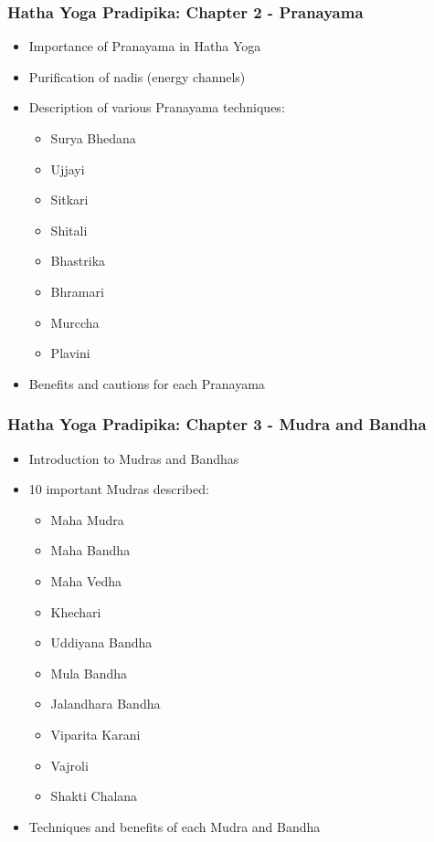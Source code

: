 \begin{frame}[fragile]\frametitle{Hatha Yoga Pradipika: Chapter 2 - Pranayama}
\begin{itemize}
    \item Importance of Pranayama in Hatha Yoga
    \item Purification of nadis (energy channels)
    \item Description of various Pranayama techniques:
    \begin{itemize}
        \item Surya Bhedana
        \item Ujjayi
        \item Sitkari
        \item Shitali
        \item Bhastrika
        \item Bhramari
        \item Murccha
        \item Plavini
    \end{itemize}
    \item Benefits and cautions for each Pranayama
\end{itemize}
\end{frame}

\begin{frame}[fragile]\frametitle{Hatha Yoga Pradipika: Chapter 3 - Mudra and Bandha}
\begin{itemize}
    \item Introduction to Mudras and Bandhas
    \item 10 important Mudras described:
    \begin{itemize}
        \item Maha Mudra
        \item Maha Bandha
        \item Maha Vedha
        \item Khechari
        \item Uddiyana Bandha
        \item Mula Bandha
        \item Jalandhara Bandha
        \item Viparita Karani
        \item Vajroli
        \item Shakti Chalana
    \end{itemize}
    \item Techniques and benefits of each Mudra and Bandha
\end{itemize}
\end{frame}


